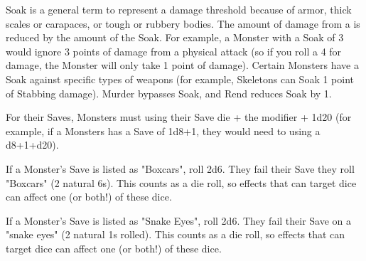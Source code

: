 {\begin{multicols}{2}

Soak is a general term to represent a damage threshold because of armor, thick scales or carapaces, or tough or rubbery bodies.  The amount of damage from a   is reduced by the amount of the Soak.  For example, a Monster with a Soak of 3 would ignore 3 points of damage from a physical attack (so if you roll a 4 for damage, the Monster will only take 1 point of damage).  Certain Monsters have a Soak against specific types of weapons (for example, Skeletons can Soak 1 point of Stabbing damage).  Murder bypasses Soak, and Rend reduces Soak by 1. 



For their Saves, Monsters must \RO using their Save die + the modifier + 1d20 (for example, if a Monsters has a Save of 1d8+1, they would need to \RO using a d8+1+d20).

If a Monster's Save is listed as "Boxcars", roll 2d6.  They fail their Save  they roll "Boxcars" (2 natural 6s).  This counts as a die roll, so effects that can target dice can affect one (or both!) of these dice.

If a Monster's Save is listed as "Snake Eyes", roll 2d6.  They fail their Save on a "snake eyes" (2 natural 1s rolled).  This counts as a die roll, so effects that can target dice can affect one (or both!) of these dice.

\newpage






\end{multicols}}
